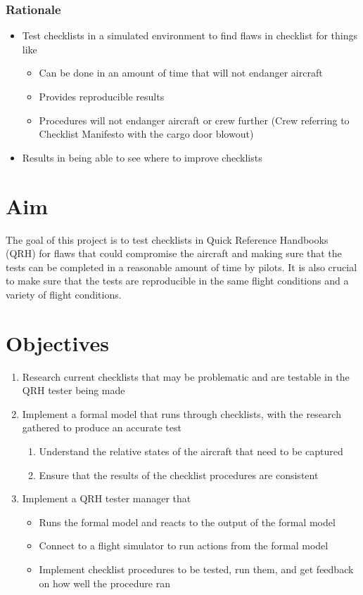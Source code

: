 \documentclass[../dissertation.tex]{subfiles}
\begin{document}
\subsubsection*{Rationale}
\begin{itemize}
    \item Test checklists in a simulated environment 
      to find flaws in checklist for things like
      \begin{itemize}
        \item Can be done in an amount of time that will not endanger aircraft
        \item Provides reproducible results
        \item Procedures will not endanger aircraft or crew further (Crew referring to Checklist Manifesto with the cargo door blowout)
      \end{itemize}
    \item Results in being able to see where to improve checklists
\end{itemize}

\section{Aim}
The goal of this project is to test checklists in Quick Reference Handbooks (QRH)
for flaws that could compromise the aircraft and making sure that the tests can
be completed in a reasonable amount of time by pilots. It is also crucial to make
sure that the tests are reproducible in the same flight conditions and a variety of
flight conditions.

\section{Objectives}
\begin{enumerate}
  \item Research current checklists that may be problematic and are testable
    in the QRH tester being made
  \item Implement a formal model that runs through checklists, with the
    research gathered to produce an accurate test
    \begin{enumerate}
      \item Understand the relative states of the aircraft that need to be captured
      \item Ensure that the results of the checklist procedures are consistent
    \end{enumerate}
  \item Implement a QRH tester manager that
    \begin{itemize}
      \item Runs the formal model and reacts to the output of the formal model
      \item Connect to a flight simulator to run actions from the formal model
      \item Implement checklist procedures to be tested, run them, and get
        feedback on how well the procedure ran
    \end{itemize}
\end{enumerate}
\end{document}
